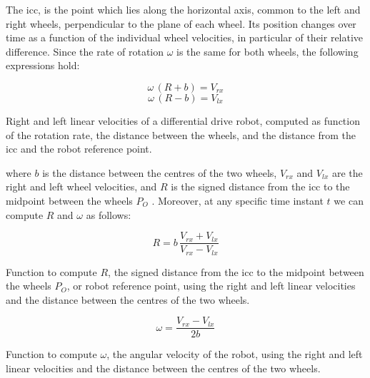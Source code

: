 The \gls{icc}, is the point which lies along the horizontal axis, common to the left 
and right wheels, perpendicular to the plane of each wheel. Its position changes 
over time as a function of the individual wheel velocities, in particular of their 
relative difference. Since the rate of rotation $\omega$ is the same for both 
wheels, the following expressions hold:
\begin{Equation}[!h]
	\centering
	\begin{equation}
	\omega \, (R + b) = V_{rx}
	\end{equation}
	\begin{equation}
	\omega \, (R - b) = V_{lx}
	\end{equation}
	\caption[Right and left linear velocities of a differential drive robot.]{Right and 
	left linear velocities of a differential drive robot, computed as function of the 
	rotation rate, the distance between the wheels, and the distance from the 
	\gls{icc} and the robot reference point.}
	\label{eq:velocities}
\end{Equation}

\noindent
where $b$ is the distance between the centres of the two wheels, $V_{rx}$ and 
$V_{lx}$ are the right and left wheel velocities, and $R$ is the signed distance 
from the \gls{icc} to the midpoint between the wheels $P_O$ 
\cite[][]{dudek2010computational}. 
Moreover, at any specific time instant $t$ we can compute $R$ and  $\omega$ as 
follows:
\begin{Equation}[!h]
	\centering
	\begin{equation}
	R = b \, \frac{V_{rx} + V_{lx}}{V_{rx} - V_{lx}}
	\end{equation}
	\caption[Function to compute the distance from the ICC to the robot 
	reference point.]{Function to compute $R$, the signed distance from the 
	\gls{icc} to the midpoint between the wheels $P_O$, or robot reference point, 
	using the right and left linear velocities and the distance between the centres of 
	the two wheels.}
	\label{eq:r}
\end{Equation}

\begin{Equation}[!h]
	\centering
	\begin{equation}
	\omega = \frac{V_{rx} - V_{lx}}{2b}
	\end{equation}
	\caption[Function to compute the angular velocity of the robot.]{Function to 
	compute $\omega$, the angular velocity of the robot, using the right and left 
	linear velocities and the distance between the centres of the two wheels.}
	\label{eq:omega}
\end{Equation}

